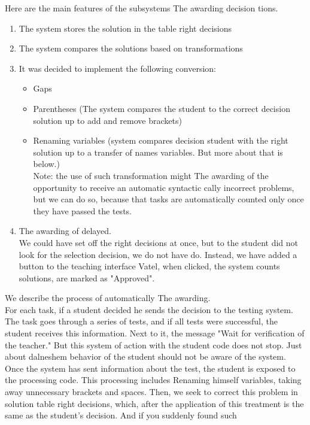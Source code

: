 \documentclass{acmtog} %
\begin{document}
Here are the main features of the subsystems The awarding decision
tions.
\begin{enumerate}
    \item The system stores the solution in the table right decisions
    \item The system compares the solutions based on transformations
    \item It was decided to implement the following conversion:
    \begin{itemize}
        \item Gaps
        \item Parentheses (The system compares the student to the correct decision
solution up to add and remove brackets)
        \item Renaming variables (system compares decision
student with the right solution up to a transfer of names
variables. But more about that is below.)\\
        Note: the use of such transformation might
The awarding of the opportunity to receive an automatic syntactic
cally incorrect problems, but we can do so, because
that tasks are automatically counted only once
they have passed the tests.
    \end{itemize}
    \item The awarding of delayed.\\
    We could have set off the right decisions at once, but to
the student did not look for the selection decision, we do not have
do. Instead, we have added a button to the teaching interface
Vatel, when clicked, the system counts solutions,
are marked as "Approved".
\end{enumerate}
We describe the process of automatically The awarding.\\
For each task, if a student decided he sends the decision to the testing system. The task goes through a series of tests, and if
all tests were successful, the student receives this information.
Next to it, the message "Wait for verification of the teacher." But this system of action with the student code does not stop.
Just about dalneshem behavior of the student should not be aware of the system.\\
Once the system has sent information about the test, the student is exposed to the processing code. This processing includes
Renaming himself variables, taking away unnecessary brackets and spaces. Then, we seek to correct this problem in solution
table right decisions, which, after the application of this treatment is the same as the student's decision. And if you suddenly found such
\end{document}
